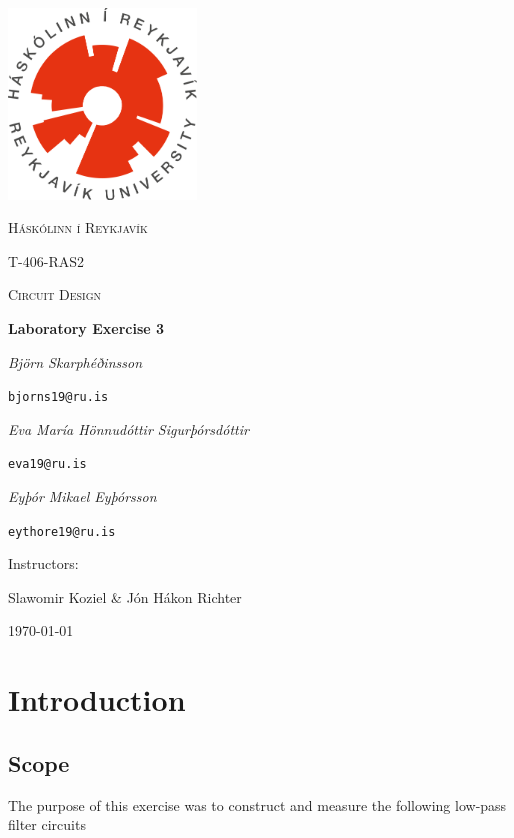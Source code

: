\documentclass{scrartcl}
\begin{document}
\begin{titlepage}
    \centering
    \includegraphics[width=5cm]{RU_2.png}\par
    \vspace{1cm}
    {\scshape\LARGE Háskólinn í Reykjavík \par}
    \vspace{1cm}
    {\scshape\Large T-406-RAS2 \par}
    {\scshape\Large Circuit Design \par}
	\vspace{1.5cm}
	{\huge\bfseries Laboratory Exercise 3\par}
	\vspace{2cm}
	{\Large\itshape Björn Skarphéðinsson}\par
	\texttt{bjorns19@ru.is}\par
	\vspace{0.5cm}
	{\Large\itshape Eva María Hönnudóttir Sigurþórsdóttir}\par
	\texttt{eva19@ru.is}\par
	\vspace{0.5cm}
	{\Large\itshape Eyþór Mikael Eyþórsson}\par
	\texttt{eythore19@ru.is}\par
	\vfill
	Instructors:\par
	Slawomir Koziel \& Jón Hákon Richter

	\vspace{1cm}

	{\large \today\par}
\end{titlepage}

\newpage
\tableofcontents

\section{Introduction}
\subsection{Scope}
The purpose of this exercise was to construct and measure the following low-pass filter circuits
\end{document}
